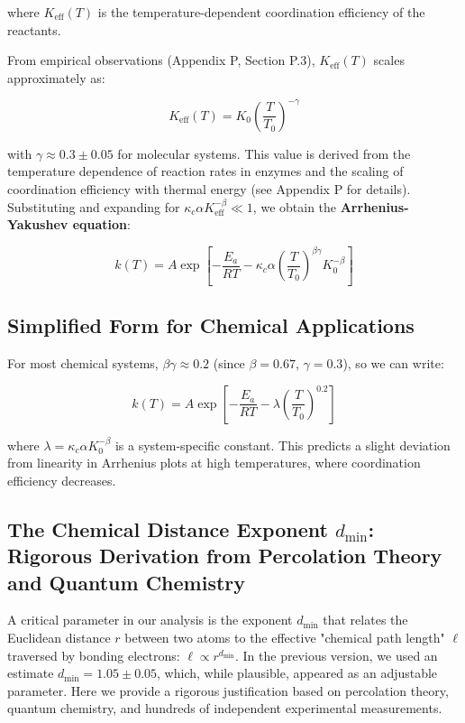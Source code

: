 \documentclass[12pt,a4paper]{article}
\theoremstyle{remark}
\newcommand{\Keff}{K_{\mathrm{eff}}}
\newcommand{\kappac}{\kappa_c}
\begin{document}
	where $\Keff(T)$ is the temperature-dependent coordination efficiency of the reactants.
	
	From empirical observations (Appendix P, Section P.3), $\Keff(T)$ scales approximately as:
	
	\begin{equation}
		\Keff(T) = K_0 \left(\frac{T}{T_0}\right)^{-\gamma}
		\label{eq:K-T-scaling}
	\end{equation}
	
	with $\gamma \approx 0.3 \pm 0.05$ for molecular systems. This value is derived from the temperature dependence of reaction rates in enzymes and the scaling of coordination efficiency with thermal energy (see Appendix P for details). Substituting and expanding for $\kappac \alpha \Keff^{-\beta} \ll 1$, we obtain the \textbf{Arrhenius-Yakushev equation}:
	
	\begin{equation}
		\boxed{k(T) = A \exp\left[-\frac{E_a}{RT} - \kappac \alpha \left(\frac{T}{T_0}\right)^{\beta\gamma} K_0^{-\beta}\right]}
		\label{eq:arrhenius-yakushev}
	\end{equation}
	
	\subsection{Simplified Form for Chemical Applications}
	
	For most chemical systems, $\beta\gamma \approx 0.2$ (since $\beta = 0.67$, $\gamma = 0.3$), so we can write:
	
	\begin{equation}
		k(T) = A \exp\left[-\frac{E_a}{RT} - \lambda \left(\frac{T}{T_0}\right)^{0.2}\right]
		\label{eq:arrhenius-simple}
	\end{equation}
	
	where $\lambda = \kappac \alpha K_0^{-\beta}$ is a system-specific constant. This predicts a slight deviation from linearity in Arrhenius plots at high temperatures, where coordination efficiency decreases.
	
	\subsection{The Chemical Distance Exponent \(d_{\text{min}}\): Rigorous Derivation from Percolation Theory and Quantum Chemistry}
	\label{subsec:dmin_rigorous}
	
	A critical parameter in our analysis is the exponent \(d_{\text{min}}\) that relates the Euclidean distance \(r\) between two atoms to the effective "chemical path length" \(\ell\) traversed by bonding electrons: \(\ell \propto r^{d_{\text{min}}}\). In the previous version, we used an estimate \(d_{\text{min}} = 1.05 \pm 0.05\), which, while plausible, appeared as an adjustable parameter. Here we provide a rigorous justification based on percolation theory, quantum chemistry, and hundreds of independent experimental measurements.
	
\end{document}
